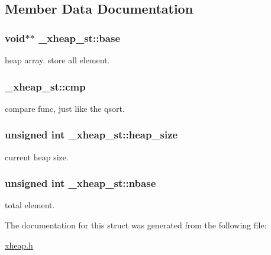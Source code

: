 \subsection{Member Data Documentation}
\hypertarget{struct__xheap__st_a4450d71a55146caf53f09ab93729499d}{
\subsubsection[{base}]{\setlength{\rightskip}{0pt plus 5cm}void$\ast$$\ast$ \-\_\-xheap\-\_\-st\-::base}}\label{struct__xheap__st_a4450d71a55146caf53f09ab93729499d}
heap array. store all element. \hypertarget{struct__xheap__st_ad637fb712b236eb45356bd5ea9ec4de7}{
\subsubsection[{cmp}]{ \-\_\-xheap\-\_\-st\-::cmp}}\label{struct__xheap__st_ad637fb712b236eb45356bd5ea9ec4de7}
compare func, just like the qsort. \hypertarget{struct__xheap__st_a50265dc661ba81a2a80060bd00ac02ac}{
\subsubsection[{heap\-\_\-size}]{\setlength{\rightskip}{0pt plus 5cm}unsigned int \-\_\-xheap\-\_\-st\-::heap\-\_\-size}}\label{struct__xheap__st_a50265dc661ba81a2a80060bd00ac02ac}
current heap size. \hypertarget{struct__xheap__st_a9575d2abc2f8b1ca4b288df6e1c6bf3c}{
\subsubsection[{nbase}]{\setlength{\rightskip}{0pt plus 5cm}unsigned int \-\_\-xheap\-\_\-st\-::nbase}}\label{struct__xheap__st_a9575d2abc2f8b1ca4b288df6e1c6bf3c}
total element. 

The documentation for this struct was generated from the following file\-:\begin{DoxyCompactItemize}
\item 
\hyperlink{xheap_8h}{xheap.\-h}\end{DoxyCompactItemize}
